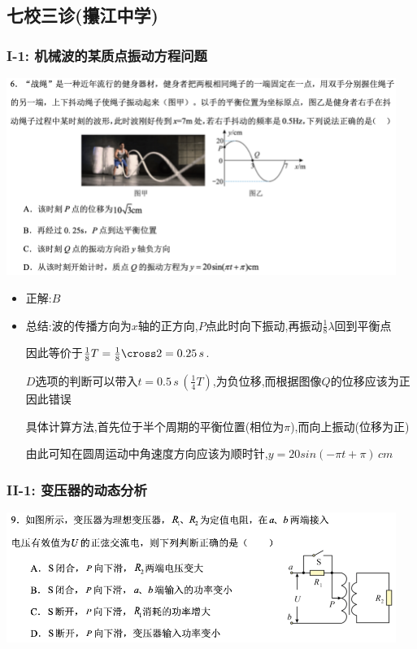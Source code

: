 \documentclass{article}
\begin{document}
\subsection{七校三诊(攥江中学)}

\subsubsection{I-1: 机械波的某质点振动方程问题}
\includegraphics[width=0.95\textwidth,keepaspectratio]{./pictures/3.11-1.png}

\begin{itemize}
    \item 正解:\quad $B$
    \item 总结:\quad 波的传播方向为$x$轴的正方向,$P$点此时向下振动,再振动$\frac{1}{8} \lambda$回到平衡点

          \hspace{3.2em}因此等价于$\frac{1}{8} T = \frac{1}{8} \cross 2 = 0.25 \,s $.

          \hspace{3.2em}$D$选项的判断可以带入$t = 0.5 \,s \, (\frac{1}{4}T)$,为负位移,而根据图像$Q$的位移应该为正因此错误

          \hspace{3.2em}具体计算方法,首先位于半个周期的平衡位置(相位为$\pi$),而向上振动(位移为正)

          \hspace{3.2em}由此可知在圆周运动中角速度方向应该为顺时针,$y = 20 sin(-\pi t + \pi) \, cm$
\end{itemize}



\vspace{2em}

\subsubsection{II-1: 变压器的动态分析}
\includegraphics[width=0.95\textwidth,keepaspectratio]{./pictures/3.11-2.png}
\end{document}
